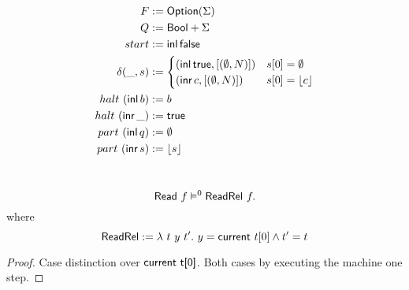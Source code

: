 \begin{definition}[$\MS{Read}$]
  \begin{align*}
    F          &:= \textsf{Option}(\Sigma) \\
    Q          &:= \textsf{Bool}+\Sigma \\
    start      &:= \operatorname{\textsf{inl}} \textsf{false} \\
    \delta (\_, s) &:=
                     \begin{cases}
                       (\operatorname{\textsf{inl}} \textsf{true}, \left[ (\emptyset, N) \right]) & s[0] = \emptyset \\
                       (\operatorname{\textsf{inr}} c, \left[ (\emptyset, N) \right])     & s[0] = \left\lfloor {c} \right\rfloor
                     \end{cases} \\
    halt   ~ (\operatorname{\textsf{inl}}  b) &:= b \\
    halt   ~ (\operatorname{\textsf{inr}} \_) &:= \textsf{true} \\
    part   ~ (\operatorname{\textsf{inl}}  q) &:= \emptyset \\
    part   ~ (\operatorname{\textsf{inr}}  s) &:= \left\lfloor {s} \right\rfloor
  \end{align*}
\end{definition}


\begin{lemma}
  \label{lem:Read_Sem}
  ~
  \[
    \textsf{Read}~f \vDash^0 \textsf{ReadRel}~f.
  \]
  where
  \[
    \textsf{ReadRel} := \lambda~t~y~t'.~ y = \textsf{current}~t[0] \land t' = t
  \]
\end{lemma}
\begin{proof}
  Case distinction over $\textsf{current t[0]}$.  Both cases by executing the machine one step.
\end{proof}




